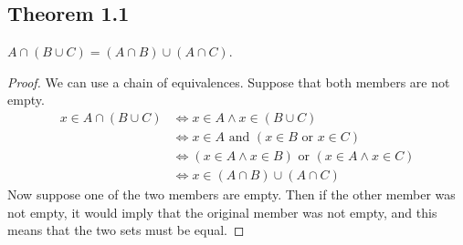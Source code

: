 \documentclass[../../main.tex]{subfiles}
\begin{document}
\subsection{Theorem 1.1}

\begin{wts}
    $A\cap(B\cup C) = (A\cap B)\cup (A\cap C)$. 
\end{wts}

\begin{proof}
    We can use a chain of equivalences. Suppose that both members are not empty.
\begin{align*}
    x\in A\cap (B\cup C) &\iff x\in A\wedge x\in (B\cup C)\\
    &\iff x\in A \text{ and } (x\in B \text{ or }x\in C)\\
    &\iff (x\in A\wedge x\in B)\text{ or }(x\in A\wedge x\in C)\\
    &\iff x\in (A\cap B)\cup (A\cap C)
\end{align*}
Now suppose one of the two members are empty. Then if the other member was not empty, 
it would imply that the original member was not empty, and this means that the two sets must be equal.
\end{proof}
\end{document}

